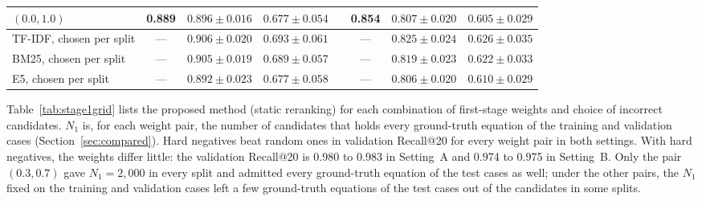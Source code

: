 \begin{table}[h]
\begin{tabular}{@{}lccccccc@{}}
$(0.0, 1.0)$ & 0.889 & $0.896 \pm 0.016$ & $0.677 \pm 0.054$ & & 0.854 & $0.807 \pm 0.020$ & $0.605 \pm 0.029$ \\
\midrule
TF-IDF, chosen per split & --- & $0.906 \pm 0.020$ & $0.693 \pm 0.061$ & & --- & $0.825 \pm 0.024$ & $0.626 \pm 0.035$ \\
BM25, chosen per split & --- & $0.905 \pm 0.019$ & $0.689 \pm 0.057$ & & --- & $0.819 \pm 0.023$ & $0.622 \pm 0.033$ \\
E5, chosen per split & --- & $0.892 \pm 0.023$ & $0.677 \pm 0.058$ & & --- & $0.806 \pm 0.020$ & $0.610 \pm 0.029$ \\
\bottomrule
\end{tabular}
\end{table}

Table~\ref{tab:stage1grid} lists the proposed method (static reranking) for each combination of
first-stage weights and choice of incorrect candidates. $N_1$ is, for each weight pair, the number
of candidates that holds every ground-truth equation of the training and validation cases
(Section~\ref{sec:compared}). Hard negatives beat random ones in validation Recall@20 for every
weight pair in both settings. With hard negatives, the weights differ little: the validation
Recall@20 is 0.980 to 0.983 in Setting~A and 0.974 to 0.975 in Setting~B. Only the pair
$(0.3, 0.7)$ gave $N_1 = 2{,}000$ in every split and admitted every ground-truth equation of the
test cases as well; under the other pairs, the $N_1$ fixed on the training and validation cases
left a few ground-truth equations of the test cases out of the candidates in some splits.

